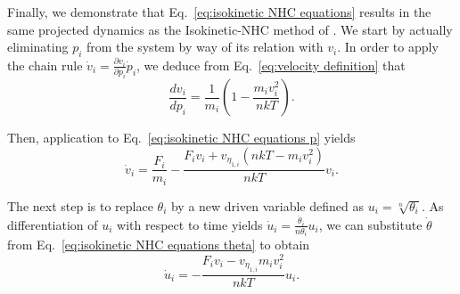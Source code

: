 \documentclass[
aip,
jcp,
reprint,
]{revtex4-1}
\newcommand{\diff}[2]{\frac{\partial #2}{\partial #1}} %
\begin{document}
Finally, we demonstrate that Eq.~\eqref{eq:isokinetic NHC equations} results in the same projected dynamics as the Isokinetic-NHC method of \citeauthor{Minary_2004} \cite{Minary_2004}.
We start by actually eliminating $p_i$ from the system by way of its relation with $v_i$.
In order to apply the chain rule $\dot{v}_i = \diff{p_i}{v_i} \dot{p}_i$, we deduce from Eq.~\eqref{eq:velocity definition} that
\begin{equation}
\label{eq:velocity derivative wrt momentum}
\frac{d v_i}{d p_i} = \frac{1}{m_i} \left(1 - \frac{m_i v_i^2}{n k T}\right).
\end{equation}

Then, application to Eq.~\eqref{eq:isokinetic NHC equations p} yields
\begin{equation}
\label{eq:v-based NHC equation}
\dot{v}_i = \frac{F_i}{m_i} - \frac{F_i v_i + v_{\eta_{1,i}} (n k T - m_i v_i^2)}{n k T} v_i.
\end{equation}

The next step is to replace $\theta_i$ by a new driven variable defined as $u_i = \sqrt[n]{\theta_i}$.
As differentiation of $u_i$ with respect to time yields $\dot{u}_i = \frac{\dot{\theta}_i}{n \theta_i} u_i$,
we can substitute $\dot{\theta}$ from Eq.~\eqref{eq:isokinetic NHC equations theta} to obtain
\begin{equation}
\label{eq:u equation of motion}
\dot{u}_i = -\frac{F_i v_i - v_{\eta_{1,i}} m_i v_i^2}{n kT} u_i.
\end{equation}
\end{document}
